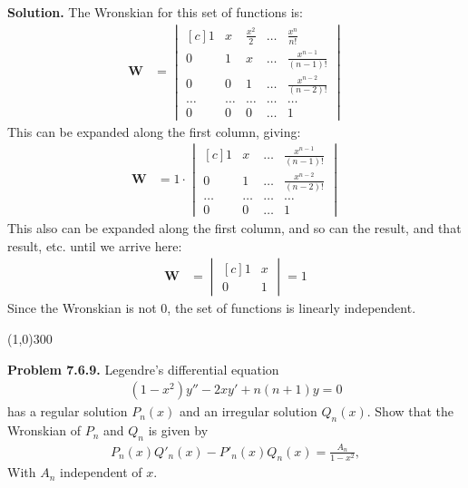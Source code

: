 \documentclass{article}
\begin{document}
\textbf{Solution.} The Wronskian for this set of functions is:
\begin{equation*}
\begin{aligned}
\mathbf{W} &= 
\begin{vmatrix*}[c]
1 & x & \frac{x^2}{2} & \dots & \frac{x^n}{n!} \\
0 & 1 & x & \dots & \frac{x^{n-1}}{(n-1)!} \\
0 & 0 & 1 & \dots & \frac{x^{n-2}}{(n-2)!} \\
\dots & \dots & \dots & \dots & \dots \\
0 & 0 & 0 & \dots & 1
\end{vmatrix*} 
\end{aligned}
\end{equation*}
This can be expanded along the first column, giving:
\begin{equation*}
\begin{aligned}
\mathbf{W} &= 
1 \cdot \begin{vmatrix*}[c]
1 & x & \dots & \frac{x^{n-1}}{(n-1)!} \\
0 & 1 & \dots & \frac{x^{n-2}}{(n-2)!} \\
\dots & \dots & \dots & \dots \\
0 & 0 & \dots & 1
\end{vmatrix*} 
\end{aligned}
\end{equation*}
This also can be expanded along the first column, and so can the result, and that result, etc. until we arrive here:
\begin{equation*}
\begin{aligned}
\mathbf{W} &= 
\begin{vmatrix*}[c]
1 & x\\
0 & 1
\end{vmatrix*} = 1
\end{aligned}
\end{equation*}
Since the Wronskian is not 0, the set of functions is linearly independent.

\begin{center}
\line(1,0){300}
\end{center}
\textbf{Problem 7.6.9.} Legendre's differential equation
\begin{equation*}
\begin{aligned}
	(1-x^2)y'' - 2xy' + n(n+1)y = 0
\end{aligned}
\end{equation*}
has a regular solution $P_n(x)$ and an irregular solution $Q_n(x)$. Show that the Wronskian of $P_n$ and $Q_n$ is given by
\begin{equation*}
\begin{aligned}
	P_n(x)Q'_n(x) - P'_n(x)Q_n(x) = \frac{A_n}{1-x^2},
\end{aligned}
\end{equation*}
With $A_n$ independent of $x$.
\end{document}
